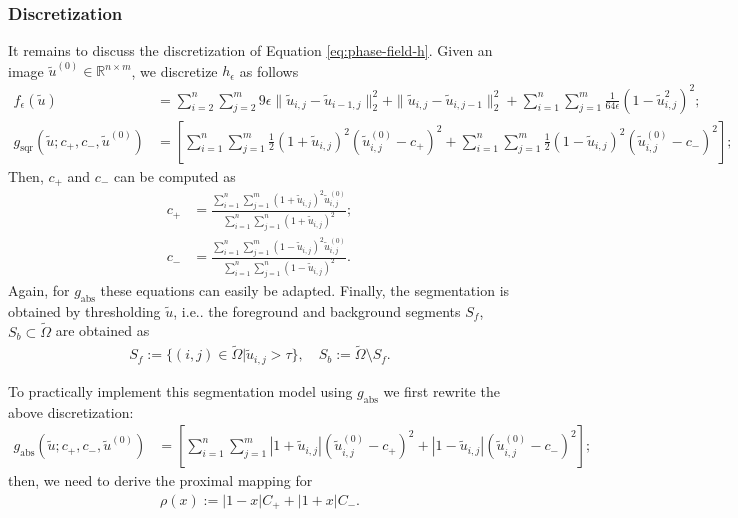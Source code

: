 \documentclass[onecolumn,final,a4paper,13pt,reqno]{siamart}
\makeatletter
\DeclareRobustCommand\onedot{\futurelet\@let@token\@onedot}
\def\@onedot{\ifx\@let@token.\else.\null\fi\xspace}
\def\ie{{i.e}\onedot} \def\Ie{{I.e}\onedot}
\makeatother
\begin{document}
\subsubsection{Discretization}

It remains to discuss the discretization of Equation \eqref{eq:phase-field-h}. Given an image $\tilde{u}^{(0)} \in \mathbb{R}^{n \times m}$, we discretize $h_\epsilon$ as follows
\begin{align}
	f_\epsilon(\tilde{u}) &= \sum_{i = 2}^n \sum_{j = 2}^m 9 \epsilon \|\tilde{u}_{i,j} - \tilde{u}_{i - 1,j}\|_2^2 + \|\tilde{u}_{i,j} - \tilde{u}_{i, j - 1}\|_2^2 + \sum_{i = 1}^n \sum_{j = 1}^m \frac{1}{64 \epsilon} (1 - \tilde{u}_{i,j}^2)^2;\\
	g_{\text{sqr}}(\tilde{u}; c_+, c_-, \tilde{u}^{(0)}) &= \left[\sum_{i = 1}^n \sum_{j = 1}^m \frac{1}{2} (1 + \tilde{u}_{i,j})^2 (\tilde{u}^{(0)}_{i,j} - c_+)^2 + \sum_{i = 1}^n \sum_{j = 1}^m \frac{1}{2} (1 - \tilde{u}_{i,j})^2 (\tilde{u}^{(0)}_{i,j} - c_-)^2\right];
\end{align}
Then, $c_+$ and $c_-$ can be computed as
\begin{align}
	c_+ &= \frac{\sum_{i = 1}^n \sum_{j = 1}^m (1 + \tilde{u}_{i,j})^2 \tilde{u}^{(0)}_{i, j}}{\sum_{i = 1}^n \sum_{j = 1}^n (1 + \tilde{u}_{i,j})^2};\\
	c_- &= \frac{\sum_{i = 1}^n \sum_{j = 1}^m (1 - \tilde{u}_{i,j})^2 \tilde{u}^{(0)}_{i, j}}{\sum_{i = 1}^n \sum_{j = 1}^n (1 - \tilde{u}_{i,j})^2}.
\end{align}
Again, for $g_{\text{abs}}$ these equations can easily be adapted. Finally, the segmentation is obtained by thresholding $\tilde{u}$, \ie the foreground and background segments $S_f$, $S_b \subset \tilde{\Omega}$ are obtained as
\begin{align}
	S_f := \{(i, j) \in \tilde{\Omega} | \tilde{u}_{i,j} > \tau\},\quad S_b := \tilde{\Omega}\setminus S_f.
\end{align}

To practically implement this segmentation model using $g_{\text{abs}}$ we first rewrite the above discretization:
\begin{align}
	g_{\text{abs}}(\tilde{u}; c_+, c_-, \tilde{u}^{(0)}) &= \left[\sum_{i = 1}^n \sum_{j = 1}^m |1 + \tilde{u}_{i,j}| (\tilde{u}^{(0)}_{i,j} - c_+)^2 + |1 - \tilde{u}_{i,j}| (\tilde{u}^{(0)}_{i,j} - c_-)^2\right];
\end{align}
then, we need to derive the proximal mapping for
\begin{align}
	\rho(x) := |1 - x|C_+ + |1 + x|C_-.
\end{align}
\end{document}
